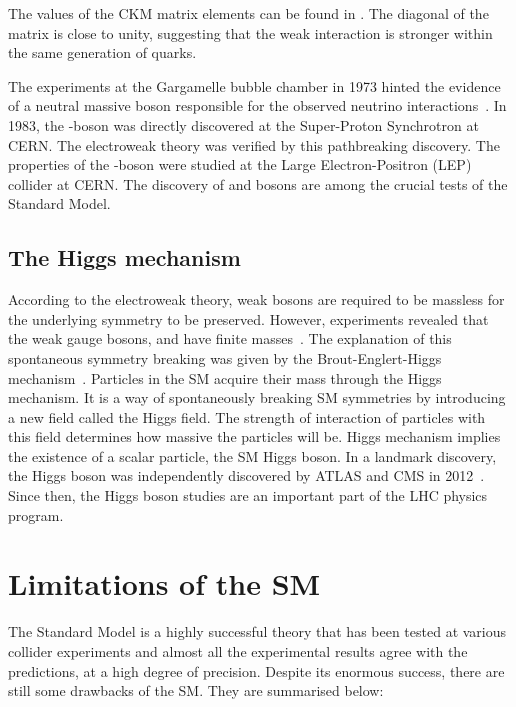 The values of the CKM matrix elements can be found in \cite{pdg2024}. The diagonal
of the matrix is close to unity, suggesting that the weak interaction is stronger within
the same generation of quarks. 

The experiments at the Gargamelle bubble chamber in 1973 hinted the evidence of a neutral
massive boson responsible for the observed neutrino interactions~\cite{HASERT1973138}. In 1983, the \PZ-boson
was directly discovered at the Super-Proton Synchrotron at CERN. The electroweak theory
was verified by this pathbreaking discovery. The properties of the \PZ-boson were
studied at the Large Electron-Positron (LEP) collider at CERN. The discovery of \PZ and \PW 
bosons are among the crucial tests of the Standard Model. 


\subsection{The Higgs mechanism}
According to the electroweak theory, weak bosons are required to be massless for the 
underlying symmetry to be preserved. However, experiments revealed that the weak gauge bosons, \PW and 
\PZ have finite masses~\cite{Brout-Englert-Higgs:1998492}. The explanation of this spontaneous symmetry breaking was given by the 
Brout-Englert-Higgs mechanism~\cite{PhysRevLett.13.508}.
Particles in the SM acquire their mass through the Higgs mechanism. It is a way of 
spontaneously breaking SM symmetries by introducing a new field called the Higgs field. The strength of
interaction of particles with this field determines how massive the particles will be. Higgs mechanism
implies the existence of a scalar particle, the SM Higgs boson. In a landmark discovery, the Higgs 
boson was independently discovered by ATLAS and CMS in 2012~\cite{ATLAS:2012yve,CMS:2012qbp}. Since then,
the Higgs boson studies are an important part of the LHC physics program. 

\section{Limitations of the SM}
The Standard Model is a highly successful theory that has been tested at various collider experiments 
and almost all the experimental results agree with the predictions, at a high degree of precision. Despite
its enormous success, there are still some drawbacks of the SM. They are summarised below:


